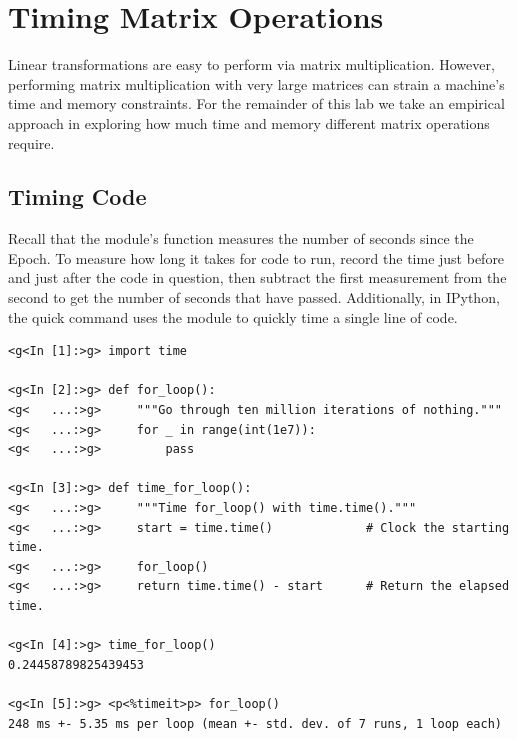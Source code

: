 \section*{Timing Matrix Operations} %

Linear transformations are easy to perform via matrix multiplication.
However, performing matrix multiplication with very large matrices can strain a machine's time and memory constraints.
For the remainder of this lab we take an empirical approach in exploring how much time and memory different matrix operations require.

\subsection*{Timing Code} %

Recall that the  module's  function measures the number of seconds since the Epoch.
To measure how long it takes for code to run, record the time just before and just after the code in question, then subtract the first measurement from the second to get the number of seconds that have passed.
Additionally, in IPython, the quick command  uses the  module to quickly time a single line of code.

\begin{lstlisting}
<g<In [1]:>g> import time

<g<In [2]:>g> def for_loop():
<g<   ...:>g>     """Go through ten million iterations of nothing."""
<g<   ...:>g>     for _ in range(int(1e7)):
<g<   ...:>g>         pass

<g<In [3]:>g> def time_for_loop():
<g<   ...:>g>     """Time for_loop() with time.time()."""
<g<   ...:>g>     start = time.time()             # Clock the starting time.
<g<   ...:>g>     for_loop()
<g<   ...:>g>     return time.time() - start      # Return the elapsed time.

<g<In [4]:>g> time_for_loop()
0.24458789825439453

<g<In [5]:>g> <p<%timeit>p> for_loop()
248 ms +- 5.35 ms per loop (mean +- std. dev. of 7 runs, 1 loop each)
\end{lstlisting}

